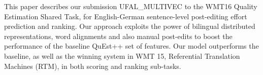 This paper describes our submission UFAL\_MULTIVEC to the WMT16 Quality Estimation Shared Task, for English-German sentence-level post-editing effort prediction and ranking. Our approach exploits the power of  bilingual distributed representations, word alignments and also manual post-edits to boost the performance of the baseline QuEst++ set of features. Our model outperforms the baseline, as well as the winning system in WMT 15, Referential Translation Machines (RTM), in both scoring and ranking sub-tasks.
